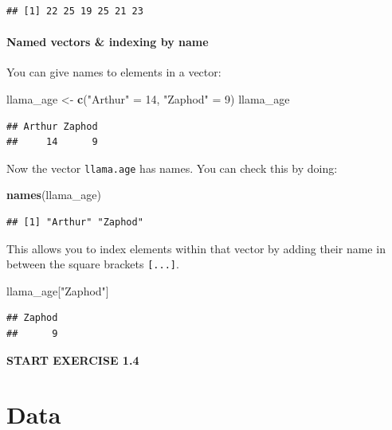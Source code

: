 \documentclass[
]{book}
\newenvironment{Shaded}{\begin{snugshade}}{\end{snugshade}}
\newcommand{\DecValTok}[1]{\textcolor[rgb]{0.00,0.00,0.81}{#1}}
\newcommand{\FunctionTok}[1]{\textcolor[rgb]{0.13,0.29,0.53}{\textbf{#1}}}
\newcommand{\NormalTok}[1]{#1}
\newcommand{\OtherTok}[1]{\textcolor[rgb]{0.56,0.35,0.01}{#1}}
\newcommand{\StringTok}[1]{\textcolor[rgb]{0.31,0.60,0.02}{#1}}
\begin{document}
\begin{verbatim}
## [1] 22 25 19 25 21 23
\end{verbatim}

\subsubsection{Named vectors \& indexing by name}\label{named-vectors-indexing-by-name}

You can give names to elements in a vector:

\begin{Shaded}
\begin{Highlighting}[]
\NormalTok{llama\_age }\OtherTok{\textless{}{-}} \FunctionTok{c}\NormalTok{(}\StringTok{"Arthur"} \OtherTok{=} \DecValTok{14}\NormalTok{, }\StringTok{"Zaphod"} \OtherTok{=} \DecValTok{9}\NormalTok{)}
\NormalTok{llama\_age}
\end{Highlighting}
\end{Shaded}

\begin{verbatim}
## Arthur Zaphod 
##     14      9
\end{verbatim}

Now the vector \texttt{llama.age} has names. You can check this by doing:

\begin{Shaded}
\begin{Highlighting}[]
\FunctionTok{names}\NormalTok{(llama\_age)}
\end{Highlighting}
\end{Shaded}

\begin{verbatim}
## [1] "Arthur" "Zaphod"
\end{verbatim}

This allows you to index elements within that vector by adding their name in between the square brackets \texttt{{[}...{]}}.

\begin{Shaded}
\begin{Highlighting}[]
\NormalTok{llama\_age[}\StringTok{"Zaphod"}\NormalTok{]}
\end{Highlighting}
\end{Shaded}

\begin{verbatim}
## Zaphod 
##      9
\end{verbatim}

\textbf{START EXERCISE 1.4}

\chapter{Data}\label{data}
\end{document}
